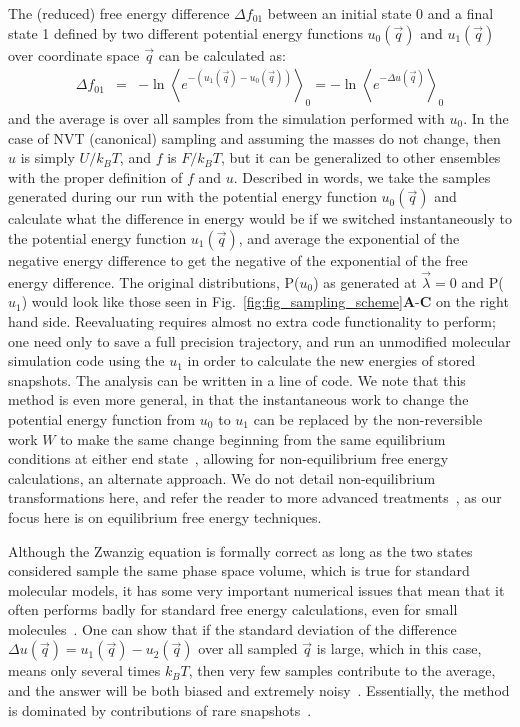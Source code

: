 \documentclass[9pt,bestpractices]{livecoms}
\newcommand{\expect}[1]{\left\langle{#1}\right\rangle}
\begin{document}
The (reduced) free energy difference $\Delta f_{01}$ between an initial state 0 and a final state 1 defined by two different potential energy functions 
$u_0(\vec{q})$ and $u_1(\vec{q})$ over coordinate space $\vec{q}$ can be calculated as:
\begin{eqnarray}
\Delta f_{01} & = & -\ln \expect{e^{-(u_1(\vec{q}) - u_0(\vec{q}))}}_0 =  -\ln \expect{e^{-\Delta u(\vec{q})} }_0
\end{eqnarray}\label{eqn.zwanzig}
and the average is over all samples from the simulation performed with $u_0$. In the case of NVT (canonical) sampling and assuming the masses do not change, then $u$ is simply $U/k_BT$, and $f$ is $F/k_BT$, but it can be generalized to other ensembles with the proper definition of $f$ and $u$.
Described in words, we take the samples generated during our run with the potential energy function $u_0(\vec{q})$ and calculate what the difference in energy would be if we switched instantaneously to the potential energy function $u_1(\vec{q})$, and average the exponential of the negative energy difference to get the negative of the exponential of the free energy difference. The original distributions, P($u_0$) as generated at $\vec{\lambda}=0$ and P($u_1$) would look like those seen in Fig.~\ref{fig:fig_sampling_scheme}\textbf{A}-\textbf{C} on the right hand side. Reevaluating requires almost no extra code functionality to perform; one need only to save a full precision trajectory, and run an unmodified molecular simulation code using the $u_1$ in order to calculate the new energies of stored snapshots. The analysis can be written in a line of code. We note that this method is even more general, in that the instantaneous work to change the potential energy function from $u_0$ to $u_1$ can be replaced by the non-reversible work $W$ to make the same change beginning from the same equilibrium conditions at either end state~\cite{jarzynski1997nonequilibrium,jarzynski1998equilibrium,crooks2000pathensemble}, allowing for non-equilibrium free energy calculations, an alternate approach. We do not detail non-equilibrium transformations here, and refer the reader to more advanced treatments~\cite{maragakis2008bayesian,oberhofer2005biased,procacci2015unbiased,shirts2003equilibrium,ytreberg2004singleensemble, gapsys2020large}, as our focus here is on equilibrium free energy techniques.

Although the Zwanzig equation is formally correct as long as the two states considered sample the same phase space volume, which is true for standard molecular models, it has some very important numerical issues that mean that it often performs badly for standard free energy calculations, even for small molecules~\cite{shirts2005comparison,lu2003appropriate}. One can show that if the standard deviation of the difference $\Delta u(\vec{q}) = u_1(\vec{q})-u_2(\vec{q})$ over all sampled $\vec{q}$ is large, which in this case, means only several times $k_BT$, then very few samples contribute to the average, and the answer will be both biased and extremely noisy~\cite{lelievre2010free}. Essentially, the method is dominated by contributions of rare snapshots~\cite{jarzynski2006rare, wu2005phasespace, wu2005phasespacea}. 
\end{document}
